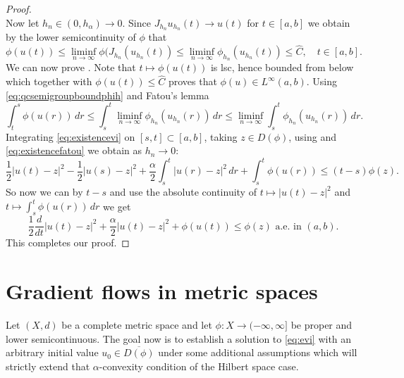 \documentclass[a4paper,11pt, leqno]{scrreprt} %
\renewcommand{\leq}{\leqslant}
\renewcommand{\leq}{\leqslant}
\theoremstyle{change}
\theoremstyle{nonumberplain}
\newtheorem{proof}{Proof}
\begin{document}
\begin{proof}
\begin{equation}
    \end{equation}
    Now let $h_n \in (0, h_\alpha) \to 0$. Since $J_{h_n}u_{h_n}(t)
    \to u(t)$ for $t \in [a,b]$ we obtain by the lower semicontinuity
    of $\phi$ that
    \begin{equation*}
      \phi(u(t)) \leq \liminf_{n \to \infty}
    \phi(J_{h_n}(u_{h_n}(t)) \leq \liminf_{n \to \infty}
    \phi_{h_n}(u_{h_n}(t)) \leq \hat C, \quad t \in [a,b].
    \end{equation*}
    We can now prove \label{item:existenceproof3}. Note that $t
    \mapsto \phi(u(t))$ is lsc, hence bounded from below which
    together with $\phi(u(t)) \leq \hat C$ proves that $\phi(u) \in
    L^\infty(a, b)$. Using \eqref{eq:qcsemigroupboundphih} and Fatou's
    lemma
    \begin{equation}
      \label{eq:existencefatou}
      \int_t^s \phi(u(r)) \, dr \leq \int_s^t \liminf_{n \to \infty}
      \phi_{h_n}(u_{h_n}(r)) \, dr \leq \liminf_{n \to \infty}
      \int_s^t \phi_{h_n}(u_{h_n}(r)) \, dr.
    \end{equation}
    Integrating \eqref{eq:existencevi} on $[s,t] \subset [a,b]$,
    taking $z \in D(\phi)$, using  and
    \eqref{eq:existencefatou} we obtain as $h_n \to 0$:
    \begin{equation*}
      \frac12 |u(t) - z|^2 - \frac12 |u(s) - z|^2 + \frac\alpha2
      \int_s^t |u(r) - z|^2 \, dr + \int_s^t \phi(u(r)) \leq (t - s)\phi(z).
    \end{equation*}
    So now we can by $t -s$ and use the absolute continuity of $t
    \mapsto |u(t) - z|^2$ and $t \mapsto \int_s^t \phi(u(r)) \, dr$ we
    get
    \begin{equation*}
      \frac12 \frac{d}{dt} |u(t) - z|^2 + \frac\alpha2 |u(t) - z|^2 +
      \phi(u(t)) \leq \phi(z) \text{ a.e.\ in $(a,b)$}.
    \end{equation*}
    This completes our proof.
\end{proof}

\chapter{Gradient flows in metric spaces}
Let $(X, d)$ be a complete metric space and let $\phi:X \to (-\infty,
\infty]$ be proper and lower semicontinuous. The goal now is to
establish a solution to \eqref{eq:evi} with an arbitrary initial value
$u_0 \in \overline{D(\phi)}$ under some additional assumptions which
will strictly extend that $\alpha$-convexity condition of the Hilbert
space case.
\end{document}
